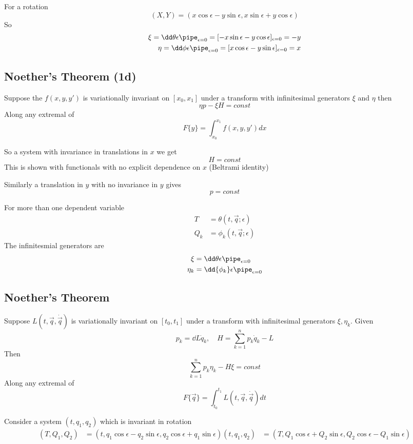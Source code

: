 \documentclass{E:/Documents/Latex/myassignment}
\begin{document}
For a rotation
\[(X,Y) = (x\cos \epsilon - y \sin \epsilon, x \sin \epsilon + y \cos \epsilon)\]
So
\begin{align*}
	\xi = \dd\theta \epsilon\pipe_{\epsilon = 0} = [-x\sin \epsilon - y\cos \epsilon]_{\epsilon = 0} = -y\\
	\eta = \dd\phi \epsilon\pipe_{\epsilon = 0} = [x\cos \epsilon - y\sin \epsilon]_{\epsilon = 0} = x\\
\end{align*}


\subsection{Noether's Theorem (1d)}
Suppose the $f(x,y,y')$ is variationally invariant on $[x_0,x_1]$ under a transform with infinitesimal generators $\xi$ and $\eta$ then
\[\eta p - \xi H = const\]
Along any extremal of
\[F\{y\} = \int_{x_0}^{x_1} f(x,y,y') dx\]

So a system with invariance in translations in $x$ we get
\[H = const\]
This is shown with functionals with no explicit dependence on $x$ (Beltrami identity)

Similarly a translation in $y$ with no invariance in $y$ gives
\[p = const\]


For more than one dependent variable
\begin{align*}
	T &= \theta(t,\vec q; \epsilon)\\
	Q_k &= \phi_k (t,\vec q; \epsilon)
\end{align*}
The infinitesmial generators are
\begin{align*}
	\xi &= \dd \theta \epsilon \pipe_{\epsilon = 0}\\
	\eta_k &= \dd {\phi_k} \epsilon \pipe_{\epsilon = 0}
\end{align*}

\subsection{Noether's Theorem}
Suppose $L(t,\vec q, \dot{\vec q})$ is variationally invariant on $[t_0,t_1]$ under a transform with infinitesimal generators $\xi, \eta_k$. Given
\[p_k = \dd L{\dot q_k}, \quad H = \sum_{k=1}^n p_k \dot q_k - L\]
Then
\[\sum_{k=1}^n p_k \eta_k - H \xi = const\]
Along any extremal of
\[F\{\vec q\} = \int_{t_0}^{t_1} L(t,\vec q, \dot{\vec q}) dt\]






Consider a system $(t,q_1,q_2)$ which is invariant in rotation
\begin{align*}
	(T,Q_1,Q_2) &= \left(t, q_1 \cos \epsilon - q_2 \sin \epsilon, q_2 \cos \epsilon + q_1 \sin \epsilon\right)
	(t,q_1,q_2) &= \left(T,Q_1 \cos \epsilon + Q_2 \sin \epsilon, Q_2 \cos \epsilon - Q_1 \sin \epsilon\right)
\end{align*}
\end{document}

